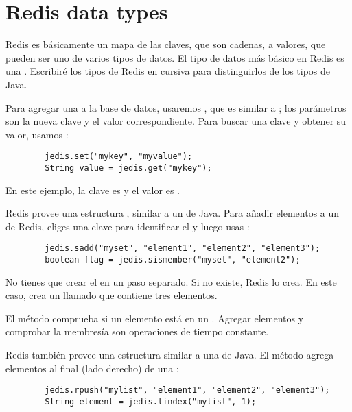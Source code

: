 \documentclass[12pt]{book}
\theoremstyle{exercise}
\begin{document}
\section{Redis data types}
\label{redis-data-types}

Redis es básicamente un mapa de las claves, que son cadenas, a
valores, que pueden ser uno de varios tipos de datos. El tipo de
datos más básico en Redis es una .  Escribiré los tipos
de Redis en cursiva para distinguirlos de los tipos de Java.

Para agregar una  a la base de datos,
usaremos , que es similar a ; los
parámetros son la nueva clave y el valor correspondiente. Para buscar
una clave y obtener su valor, usamos :

\begin{verbatim}
        jedis.set("mykey", "myvalue");
        String value = jedis.get("mykey");
\end{verbatim}

En este ejemplo, la clave es  y el valor es
.


Redis provee una estructura , similar a un
 de Java. Para añadir elementos a un  de Redis,
eliges una clave para identificar el  y luego usas
:

\begin{verbatim}
        jedis.sadd("myset", "element1", "element2", "element3");
        boolean flag = jedis.sismember("myset", "element2");
\end{verbatim}

No tienes que crear el  en un paso separado. Si no existe,
Redis lo crea. En este caso, crea un  llamado 
que contiene tres elementos.

El método  comprueba si un elemento está en un
. Agregar elementos y comprobar la membresía son operaciones
de tiempo constante.


Redis también provee una estructura  similar a una
 de Java. El método
 agrega elementos al final (lado derecho) de una
:

\begin{verbatim}
        jedis.rpush("mylist", "element1", "element2", "element3");
        String element = jedis.lindex("mylist", 1);
\end{verbatim}
\end{document}
